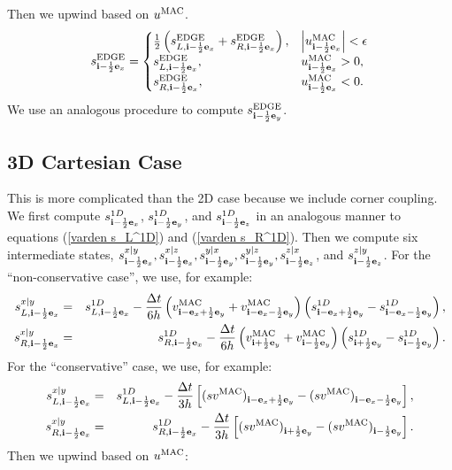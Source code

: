 Then we upwind based on $u^{\rm MAC}$.
\begin{equation}
s_{{\bf i}-\frac{1}{2}{\bf e}_x}^{\rm EDGE} =
\begin{cases}
\frac{1}{2}\left(s_{L,{\bf i}-\frac{1}{2}{\bf e}_x}^{\rm EDGE} + s_{R,{\bf i}-\frac{1}{2}{\bf e}_x}^{\rm EDGE}\right), & \left|u^{\rm MAC}_{{\bf i}-\frac{1}{2}{\bf e}_x}\right| < \epsilon \\
s_{L,{\bf i}-\frac{1}{2}{\bf e}_x}^{\rm EDGE}, & u^{\rm MAC}_{{\bf i}-\frac{1}{2}{\bf e}_x} > 0, \\
s_{R,{\bf i}-\frac{1}{2}{\bf e}_x}^{\rm EDGE}, & u^{\rm MAC}_{{\bf i}-\frac{1}{2}{\bf e}_x} < 0.
\end{cases}\label{varden s^edge upwind}
\end{equation}
We use an analogous procedure to compute $s_{{\bf i}-\frac{1}{2}{\bf e}_y}^{\rm EDGE}$.

\subsection{3D Cartesian Case}
This is more complicated than the 2D case because we include corner
coupling.  We first compute $s_{{\bf i}-\frac{1}{2}{\bf e}_x}^{1D}$,
$s_{{\bf i}-\frac{1}{2}{\bf e}_y}^{1D}$, and $s_{{\bf i}-\frac{1}{2}{\bf e}_z}^{1D}$ in an
analogous manner to equations (\ref{varden s_L^1D}) and (\ref{varden
  s_R^1D}).  Then we compute six intermediate states,
$s_{{\bf i}-\frac{1}{2}{\bf e}_x}^{x|y}, s_{{\bf i}-\frac{1}{2}{\bf e}_x}^{x|z},
s_{{\bf i}-\frac{1}{2}{\bf e}_y}^{y|x}, s_{{\bf i}-\frac{1}{2}{\bf e}_y}^{y|z},
s_{{\bf i}-\frac{1}{2}{\bf e}_z}^{z|x}$, and $s_{{\bf i}-\frac{1}{2}{\bf e}_z}^{z|y}$.  For the
``non-conservative case'', we use, for example:
\begin{eqnarray}
s_{L,{\bf i}-\frac{1}{2}{\bf e}_x}^{x|y} &=& s_{L,{\bf i}-\frac{1}{2}{\bf e}_x}^{1D} - \frac{\Delta t}{6h}\left(v_{{\bf i}-{\bf e}_x+\frac{1}{2}{\bf e}_y}^{\rm MAC} + v_{{\bf i}-{\bf e}_x-\frac{1}{2}{\bf e}_y}^{\rm MAC}\right)\left(s_{{\bf i}-{\bf e}_x+\frac{1}{2}{\bf e}_y}^{1D} - s_{{\bf i}-{\bf e}_x-\frac{1}{2}{\bf e}_y}^{1D}\right), \\
s_{R,{\bf i}-\frac{1}{2}{\bf e}_x}^{x|y} &=& s_{R,{\bf i}-\frac{1}{2}{\bf e}_x}^{1D} - \frac{\Delta t}{6h}\left(v_{{\bf i}+\frac{1}{2}{\bf e}_y}^{\rm MAC} + v_{{\bf i}-\frac{1}{2}{\bf e}_y}^{\rm MAC}\right)\left(s_{{\bf i}+\frac{1}{2}{\bf e}_y}^{1D} - s_{{\bf i}-\frac{1}{2}{\bf e}_y}^{1D}\right).
\end{eqnarray}
For the ``conservative'' case, we use, for example:
\begin{eqnarray}
s_{L,{\bf i}-\frac{1}{2}{\bf e}_x}^{x|y} &=& s_{L,{\bf i}-\frac{1}{2}{\bf e}_x}^{1D} - \frac{\Delta t}{3h}\left[(sv^{\rm MAC})_{{\bf i}-{\bf e}_x+\frac{1}{2}{\bf e}_y}-(sv^{\rm MAC})_{{\bf i}-{\bf e}_x-\frac{1}{2}{\bf e}_y}\right], \\
s_{R,{\bf i}-\frac{1}{2}{\bf e}_x}^{x|y} &=& s_{R,{\bf i}-\frac{1}{2}{\bf e}_x}^{1D} - \frac{\Delta t}{3h}\left[(sv^{\rm MAC})_{{\bf i}+\frac{1}{2}{\bf e}_y}-(sv^{\rm MAC})_{{\bf i}-\frac{1}{2}{\bf e}_y}\right].
\end{eqnarray}
Then we upwind based on $u^{\rm MAC}$:
